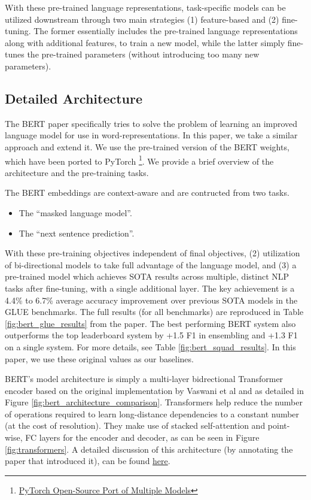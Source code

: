 \documentclass{article}
\begin{document}
With these pre-trained language representations, task-specific models can be utilized downstream through two main strategies (1) feature-based and (2) fine-tuning. The former essentially includes the pre-trained language representations along with additional features, to train a new model, while the latter simply fine-tunes the pre-trained parameters (without introducing too many new parameters).


\subsection{Detailed Architecture}
The BERT paper \cite{BERT} specifically tries to solve the problem of learning an improved language model for use in word-representations. In this paper, we take a similar approach and extend it. We use the pre-trained version of the BERT weights, which have been ported to PyTorch \footnote{\href{https://github.com/huggingface/pytorch-pretrained-BERT}{PyTorch Open-Source Port of Multiple Models}}. We provide a brief overview of the architecture and the pre-training tasks.

The BERT embeddings are context-aware and are contructed from two tasks.
\begin{itemize}
    \item The ``masked language model''. 
    \item The ``next sentence prediction''.
\end{itemize}

With these pre-training objectives independent of final objectives, (2) utilization of bi-directional models to take full advantage of the language model, and (3) a pre-trained model which achieves SOTA results across multiple, distinct NLP tasks after fine-tuning, with a single additional layer. The key achievement is a 4.4\% to 6.7\% average accuracy improvement over previous SOTA models in the GLUE benchmarks. The full results (for all benchmarks) are reproduced in Table \ref{fig:bert_glue_results} from the paper. The best performing BERT system also outperforms the top leaderboard system by +1.5 F1 in ensembling and +1.3 F1 on a single system. For more details, see Table \ref{fig:bert_squad_results}. In this paper, we use these original values as our baselines.

BERT's model architecture is simply a multi-layer bidrectional Transformer encoder based on the original implementation by Vaswani et al \cite{AttentionIsAllYouNeed} and as detailed in Figure \ref{fig:bert_architecture_comparison}. Transformers help reduce the number of operations required to learn long-distance dependencies to a constant number (at the cost of resolution). They make use of stacked self-attention and point-wise, FC layers for the encoder and decoder, as can be seen in Figure \ref{fig:transformers}. A detailed discussion of this architecture (by annotating the paper that introduced it), can be found \href{http://nlp.seas.harvard.edu/2018/04/03/attention.html}{here}.
\end{document}
